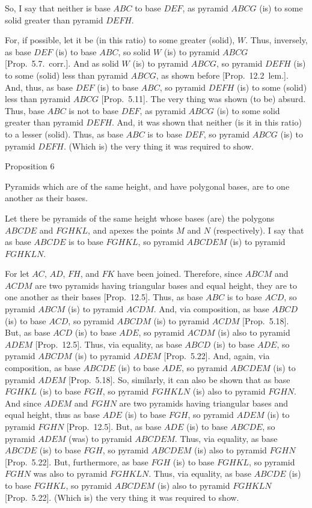 So, I say that neither is base $ABC$ to base $DEF$, as pyramid $ABCG$ (is) to 
some solid greater
than pyramid $DEFH$.

For, if possible, let it be (in this ratio) to some greater (solid), $W$. Thus, inversely, as base $DEF$ (is) to base
$ABC$, so solid $W$ (is) to pyramid $ABCG$ [Prop.~5.7.~corr.]. And as solid $W$ (is) to pyramid $ABCG$, so pyramid
$DEFH$ (is) to some (solid) less than pyramid $ABCG$, as shown before [Prop.~12.2~lem.]. And, thus, as base $DEF$ (is) to base
$ABC$, so pyramid $DEFH$ (is) to some (solid) less than pyramid 
$ABCG$ [Prop.~5.11]. The very thing
was shown (to be) absurd. Thus, base $ABC$ is not to base $DEF$, as pyramid $ABCG$ (is) to some
solid greater than pyramid $DEFH$. And, it was shown that neither (is it in this ratio) to a lesser (solid). Thus, as base
$ABC$ is to base $DEF$, so pyramid $ABCG$ (is) to pyramid $DEFH$. (Which is) the very
thing it was required to show.


\begin{center}
{\large Proposition 6}
\end{center}

Pyramids which are of the same height, and have polygonal bases, are to one
another as their bases.\\

\centerline{}

Let there be pyramids of the same height whose bases (are) the polygons $ABCDE$ and $FGHKL$,
and apexes the points $M$ and $N$ (respectively). I say that as base $ABCDE$ is to base $FGHKL$,
so pyramid $ABCDEM$ (is) to pyramid $FGHKLN$.

For let $AC$, $AD$, $FH$, and $FK$ have been joined. Therefore, since $ABCM$ and
$ACDM$ are two pyramids having triangular bases and equal height, they are to one another
as their bases [Prop.~12.5]. Thus, as base $ABC$ is to base $ACD$, so pyramid 
$ABCM$ (is) to pyramid $ACDM$.  And, via composition, as base $ABCD$ (is) to base $ACD$, so
pyramid $ABCDM$ (is) to pyramid $ACDM$ [Prop.~5.18]. But, as base
$ACD$ (is) to base $ADE$, so pyramid $ACDM$ (is) also to pyramid $ADEM$ [Prop.~12.5]. Thus, via equality, 
as base $ABCD$ (is) to base $ADE$, so pyramid $ABCDM$ (is) to  pyramid $ADEM$ [Prop.~5.22]. And, again, via composition, as base $ABCDE$ (is) to base $ADE$,
so pyramid $ABCDEM$ (is) to pyramid $ADEM$ [Prop.~5.18]. 
So, similarly, it can also be shown that as base $FGHKL$ (is) to base $FGH$, so pyramid 
$FGHKLN$ (is) also to pyramid $FGHN$. And since $ADEM$ and $FGHN$ are two
pyramids having triangular bases and equal height,  thus as base $ADE$ (is) to base $FGH$, so
pyramid $ADEM$ (is) to pyramid $FGHN$ [Prop.~12.5]. 
But, as base $ADE$ (is) to base $ABCDE$,  so pyramid $ADEM$ (was) to 
pyramid $ABCDEM$. Thus, via equality,  as base $ABCDE$ (is) to base $FGH$,
so pyramid $ABCDEM$ (is) also to pyramid $FGHN$ [Prop.~5.22]. But,
furthermore, as base $FGH$ (is) to base $FGHKL$, so pyramid $FGHN$ was also to pyramid
$FGHKLN$. Thus, via equality, as base $ABCDE$ (is) to base $FGHKL$, so
pyramid $ABCDEM$ (is) also to pyramid $FGHKLN$  [Prop.~5.22]. (Which is) the very thing it was required
to show.

